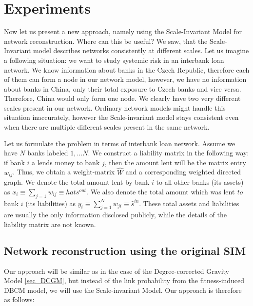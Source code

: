 \chapter{Experiments}
Now let us present a new approach, namely using the Scale-Invariant Model for network reconstruction. Where can this be useful? We saw, that the Scale-Invariant model describes networks consistently at different scales. Let us imagine a following situation: we want to study systemic risk in an interbank loan network. We know information about banks in the Czech Republic, therefore each of them can form a node in our network model, however, we have no information about banks in China, only their total exposure to Czech banks and vice versa. Therefore, China would only form one node. We clearly have two very different scales present in our network. Ordinary network models might handle this situation inaccurately, however the Scale-invariant model stays consistent even when there are multiple different scales present in the same network.

Let us formulate the problem in terms of interbank loan network. Assume we have $N$ banks labeled $1,\dots N$. We construct a liability matrix in the following way: if bank $i$ a lends money to bank $j$, then the amount lent will be the matrix entry $w_{ij}$. Thus, we obtain a weight-matrix $\hat{W}$ and a corresponding weighted directed graph. We denote the total amount lent by bank $i$ to all other banks (its assets) as $x_i \equiv \sum_{j=1} w_{ij} \equiv hat{s}^{out}$. We also denote the total amount which was lent \textit{to} bank $i$ (its liabilities) as $y_i \equiv \sum_{j=1}^N w_{ji} \equiv \hat{s}^{in}$. These total assets and liabilities are usually the only information disclosed publicly, while the details of the liability matrix are not known. 

\section{Network reconstruction using the original SIM}

Our approach will be similar as in the case of the Degree-corrected Gravity Model \ref{sec_DCGM}, but instead of the link probability from the fitness-induced DBCM model, we will use the Scale-invariant Model. Our approach is therefore as follows:


